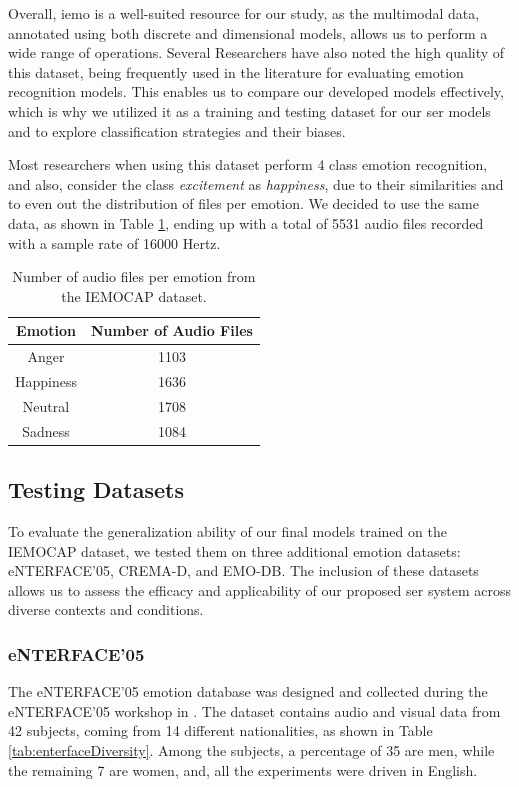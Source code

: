 Overall, \ac{iemo} is a well-suited resource for our study, as the multimodal data, annotated using both discrete and dimensional models, allows us to perform a wide range of operations. Several Researchers have also noted the high quality of this dataset, being frequently used in the literature for evaluating emotion recognition models. This enables us to compare our developed models effectively, which is why we utilized it as a training and testing dataset for our \ac{ser} models and to explore classification strategies and their biases.

Most researchers when using this dataset perform 4 class emotion recognition, and also, consider the class \textit{excitement} as \textit{happiness}, due to their similarities and to even out the distribution of files per emotion. We decided to use the same data, as shown in Table \ref{tab:dataDist}, ending up with a total of 5531 audio files recorded with a sample rate of 16000 Hertz.

\begin{table}[H]
	\centering
	\caption{Number of audio files per emotion from the IEMOCAP dataset.}
	\label{tab:dataDist}
	\begin{tabular}{cc}
		\toprule
		Emotion & Number of Audio Files \\
		\midrule
		Anger 		&  1103\\
		Happiness 	&  1636\\
		Neutral	 	&  1708\\
		Sadness 	&  1084\\
		\bottomrule
	\end{tabular}
\end{table}


\subsection{Testing Datasets}

To evaluate the generalization ability of our final models trained on the IEMOCAP dataset, we tested them on three additional emotion datasets: eNTERFACE’05, CREMA-D, and EMO-DB. The inclusion of these datasets allows us to assess the efficacy and applicability of our proposed \ac{ser} system across diverse contexts and conditions.

\subsubsection{eNTERFACE'05}

The eNTERFACE’05 emotion database \cite{Martin2006} was designed and collected during the eNTERFACE’05 workshop in \citeyear{Martin2006}. The dataset contains audio and visual data from 42 subjects, coming from 14 different nationalities, as shown in Table \ref{tab:enterfaceDiversity}. Among the subjects, a percentage of 35 are men, while the remaining 7 are women, and, all the experiments were driven in English.

